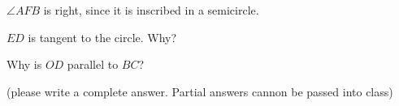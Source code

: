 













$\angle AFB$ is right, since it is inscribed in a semicircle.

$ED$ is tangent to the circle. Why?


Why is $OD$ parallel to $BC$?

(please write a complete answer. Partial answers cannon be passed into class)



